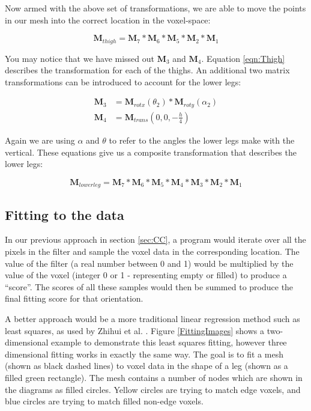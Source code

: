 Now armed with the above set of transformations, we are able to move the points in our mesh into the correct location in the voxel-space:

\begin{equation}
	\label{eqn:Thigh} \mathbf{M}_{thigh} = \mathbf{M}_{7} * \mathbf{M}_{6} * \mathbf{M}_{5} * \mathbf{M}_{2} * \mathbf{M}_{1}
\end{equation}

You may notice that we have missed out $\mathbf{M}_{3}$ and $\mathbf{M}_{4}$.
Equation \ref{eqn:Thigh} describes the transformation for each of the thighs.
An additional two matrix transformations can be introduced to account for the lower legs:

\begin{align}
	\mathbf{M}_{3} &= \mathbf{M}_{rotx}(\theta_{2}) * \mathbf{M}_{roty}(\alpha_{2}) \\
	\mathbf{M}_{4} &= \mathbf{M}_{trans}(0, 0, -\frac{h}{4})
\end{align}

Again we are using $\alpha$ and $\theta$ to refer to the angles the lower legs make with the vertical.
These equations give us a composite transformation that describes the lower legs:

\begin{equation}
	\label{eqn:LowerLegs} \mathbf{M}_{lowerleg} = \mathbf{M}_{7} * \mathbf{M}_{6} * \mathbf{M}_{5} * \mathbf{M}_{4} * \mathbf{M}_{3} * \mathbf{M}_{2} * \mathbf{M}_{1}
\end{equation}



\subsection{Fitting to the data}

In our previous approach in section \ref{sec:CC}, a program would iterate over all the pixels in the filter and sample the
voxel data in the corresponding location.
The value of the filter (a real number between 0 and 1) would be multiplied by the value of the voxel (integer 0 or 1 - representing empty or filled) to produce a ``score''.
The scores of all these samples would then be summed to produce the final fitting score for that orientation.

A better approach would be a more traditional linear regression method such as least squares, as used by Zhihui et al. \cite{LinearModelFitting}.
Figure \ref{FittingImages} shows a two-dimensional example to demonstrate this least squares fitting, however three dimensional fitting works in exactly the same way.
The goal is to fit a mesh (shown as black dashed lines) to voxel data in the shape of a leg (shown as a filled green rectangle).
The mesh contains a number of nodes which are shown in the diagrams as filled circles.
Yellow circles are trying to match edge voxels, and blue circles are trying to match filled non-edge voxels.

